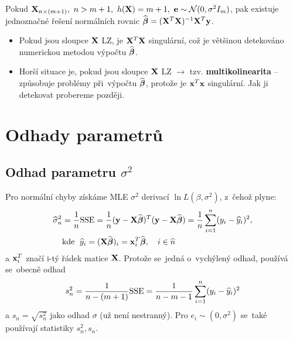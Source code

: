 \begin{remark}
	Pokud $\mathbf{X}_{n\times(m+1)},~n>m+1,~h(\mathbf{X}) = m+1,~\mathbf{e}\sim\mathcal{N}(0,\sigma^2 I_m)$, pak existuje jednoznačné řešení normálních rovnic $\widehat{\boldsymbol{\beta}} = (\mathbf{X}^T\mathbf{X})^{-1}\mathbf{X}^T\mathbf{y}$.
\end{remark}
\begin{remark}
	\begin{itemize}
		\item Pokud jsou sloupce $\mathbf{X}$ LZ, je $\mathbf{X}^T\mathbf{X}$ singulární, což je většinou detekováno numerickou metodou výpočtu $\widehat{\boldsymbol{\beta}}$.
		\item Horší situace je, pokud jsou sloupce $\mathbf{X}$  LZ $\rightarrow$ tzv. \textbf{multikolinearita} -- způsobuje problémy při~výpočtu $\widehat{\boldsymbol{\beta}}$, protože je $\mathbf{x}^T\mathbf{x}$  singulární. Jak ji detekovat probereme později.
	\end{itemize}
\end{remark}

\section{Odhady parametrů}
\subsection{Odhad parametru $\sigma^2$ }
Pro normální chyby získáme MLE $\sigma^2$ derivací $\ln L(\beta, \sigma^2)$, z~čehož plyne:
\begin{align*}
	\widehat{\sigma}_n^2 & = \frac{1}{n} \mathrm{SSE} = \frac{1}{n}(\mathbf{y} - \mathbf{X} \widehat{\boldsymbol{\beta}})^T(\mathbf{y} - \mathbf{X} \widehat{\boldsymbol{\beta}}) = \frac{1}{n} \sum\limits_{i=1}^{n} (y_i - \widehat{y}_i)^2, \\
	& \text{kde \;} \widehat{y}_i = (\mathbf{X} \widehat{\boldsymbol{\beta}})_i = \mathbf{x}_i^T \widehat{\boldsymbol{\beta}}, \quad i\in\widehat{n} \\
\end{align*}
a $\mathbf{x}_i^T$ značí i-tý řádek matice $\mathbf{X}$. Protože se~jedná o~vychýlený odhad, používá se~obecně odhad
 $$
	s_n^2 = \frac{1}{n-(m+1)} \mathrm{SSE} = \frac{1}{n - m - 1} \sum\limits_{i=1}^{n} (y_i - \widehat{y}_i)^2
 $$
a $s_n = \sqrt{s_n^2}$ jako odhad $\sigma$ (už není nestranný).
Pro $e_i \sim (0,\sigma^2)$ se~také používají statistiky $s_n^2, s_n$.

